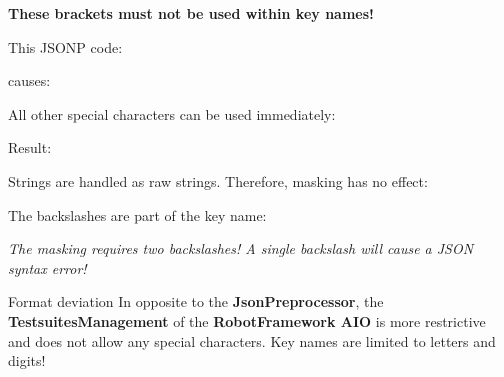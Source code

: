 \textbf{These brackets must not be used within key names!}

This JSONP code:

\begin{pythoncode}
{
    "[" : 1,
    "B" : ${[}
}
\end{pythoncode}

causes:

\begin{pythonlog}
Error: 'Invalid expression found: '${[}' - The brackets mismatch!!!'!
\end{pythonlog}

All other special characters can be used immediately:


Result:


Strings are handled as raw strings. Therefore, masking has no effect:


The backslashes are part of the key name:


\textit{The masking requires two backslashes! A single backslash will cause a JSON syntax error!}

\vspace{2ex}

\begin{boxhint}{Format deviation}
In opposite to the \textbf{JsonPreprocessor}, the \textbf{TestsuitesManagement} of the \textbf{RobotFramework AIO} is more restrictive
and does not allow any special characters. Key names are limited to letters and digits!
\end{boxhint}


